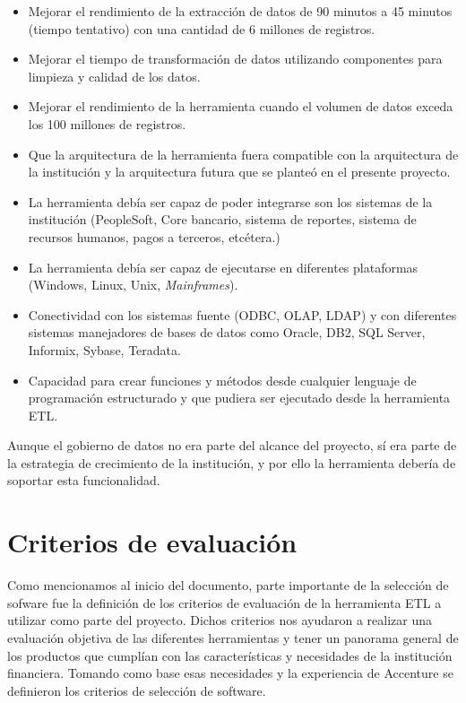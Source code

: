 \begin{itemize}

\item Mejorar el rendimiento de la extracción de datos de 90 minutos a 45
  minutos (tiempo tentativo) con una cantidad de 6 millones de registros.

\item Mejorar el tiempo de transformación de datos utilizando componentes para
  limpieza y calidad de los datos.

\item Mejorar el rendimiento de la herramienta cuando el volumen de datos exceda
  los 100 millones de registros.

\item Que la arquitectura de la herramienta fuera compatible con la arquitectura
  de la institución y la arquitectura futura que se planteó en el presente
  proyecto.

\item La herramienta debía ser capaz de poder integrarse son los sistemas de la
  institución (PeopleSoft, Core bancario, sistema de reportes, sistema de
  recursos humanos, pagos a terceros, etcétera.)

\item La herramienta debía ser capaz de ejecutarse en diferentes plataformas
  (Windows, Linux, Unix, \emph{Mainframes}).

\item Conectividad con los sistemas fuente (ODBC, OLAP, LDAP) y con diferentes
  sistemas manejadores de bases de datos como Oracle, DB2, SQL Server, Informix,
  Sybase, Teradata.

\item Capacidad para crear funciones y métodos desde cualquier lenguaje de
  programación estructurado y que pudiera ser ejecutado desde la herramienta
  ETL.
\end{itemize}

Aunque el gobierno de datos no era parte del alcance del proyecto, sí era parte
de la estrategia de crecimiento de la institución, y por ello la herramienta
debería de soportar esta funcionalidad.

\section{Criterios de evaluación}

Como mencionamos al inicio del documento, parte importante de la selección de
sofware fue la definición de los criterios de evaluación de la herramienta ETL a
utilizar como parte del proyecto. Dichos criterios nos ayudaron a realizar una
evaluación objetiva de las diferentes herramientas y tener un panorama general
de los productos que cumplían con las características y necesidades de la
institución financiera. Tomando como base esas necesidades y la experiencia de
Accenture se definieron los criterios de selección de software.

